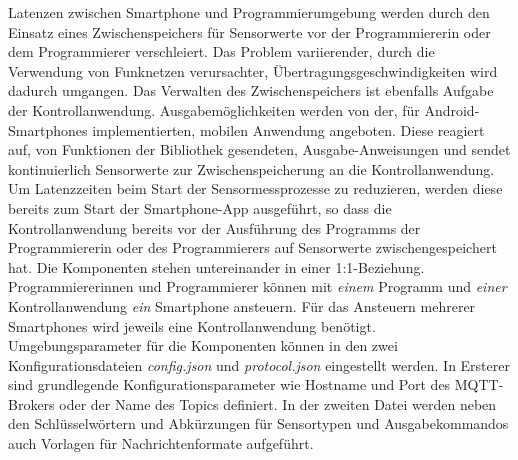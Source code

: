 \documentclass[11pt,a4paper]{report}
\begin{document}
Latenzen zwischen Smartphone und Programmierumgebung werden durch den Einsatz eines Zwischenspeichers für Sensorwerte vor der Programmiererin oder dem Programmierer verschleiert.
Das Problem variierender, durch die Verwendung von Funknetzen verursachter, Übertragungsgeschwindigkeiten wird dadurch umgangen.
Das Verwalten des Zwischenspeichers ist ebenfalls Aufgabe der Kontrollanwendung.
Ausgabemöglichkeiten werden von der, für Android-Smartphones implementierten, mobilen Anwendung angeboten.
Diese reagiert auf, von Funktionen der Bibliothek gesendeten, Ausgabe-Anweisungen und sendet kontinuierlich Sensorwerte zur Zwischenspeicherung an die Kontrollanwendung.
Um Latenzzeiten beim Start der Sensormessprozesse zu reduzieren, werden diese bereits zum Start der Smartphone-App ausgeführt, so dass die Kontrollanwendung bereits vor der Ausführung des Programms der Programmiererin oder des Programmierers auf Sensorwerte zwischengespeichert hat.
Die Komponenten stehen untereinander in einer 1:1-Beziehung.
Programmiererinnen und Programmierer können mit \textit{einem} Programm und \textit{einer} Kontrollanwendung \textit{ein} Smartphone ansteuern.
Für das Ansteuern mehrerer Smartphones wird jeweils eine Kontrollanwendung benötigt.
Umgebungsparameter für die Komponenten können in den zwei Konfigurationsdateien \textit{config.json} und \textit{protocol.json} eingestellt werden.
In Ersterer sind grundlegende Konfigurationsparameter wie Hostname und Port des MQTT-Brokers oder der Name des Topics definiert.
In der zweiten Datei werden neben den Schlüsselwörtern und Abkürzungen für Sensortypen und Ausgabekommandos auch Vorlagen für Nachrichtenformate aufgeführt.
\end{document}
